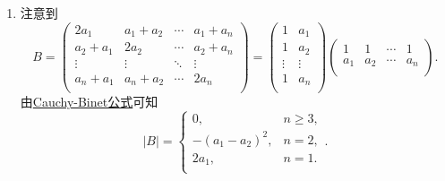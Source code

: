 \documentclass[../../main.tex]{subfiles}%
\begin{document}
\begin{solution}
\begin{enumerate}[(1)]
\item 注意到$$B=\left( \begin{matrix}
2a_1 & a_1+a_2 & \cdots & a_1+a_n \\
a_2+a_1 & 2a_2 & \cdots & a_2+a_n \\
\vdots & \vdots & \ddots & \vdots \\
a_n+a_1 & a_n+a_2 & \cdots & 2a_n \\
\end{matrix} \right) =\left( \begin{matrix}
1 & a_1 \\
1 & a_2 \\
\vdots & \vdots \\
1 & a_n \\
\end{matrix} \right) \left( \begin{matrix}
1 & 1 & \cdots & 1 \\
a_1 & a_2 & \cdots & a_n \\
\end{matrix} \right).$$由\hyperref[theorem:Cauchy-Binet公式]{Cauchy-Binet公式}可知$$\left| B \right|=\begin{cases}
0, & n\geqslant 3, \\
-(a_1-a_2)^2, & n=2, \\
2a_1, & n=1. \\
\end{cases}.$$


\end{enumerate}
\end{solution}
\end{document}
